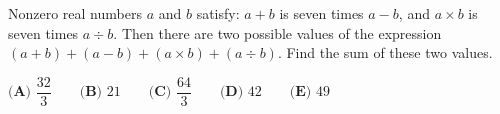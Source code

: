 Nonzero real numbers $a$ and $b$ satisfy: $a+b$ is seven times $a-b$, and $a\times b$ is seven times $a\div b$. Then there are two possible values of the expression $(a+b)+(a-b)+(a\times b)+(a\div b)$. Find the sum of these two values.

$\textbf{(A) }\dfrac{32}{3}\qquad\textbf{(B) }21\qquad\textbf{(C) }\dfrac{64}{3}\qquad\textbf{(D) }42\qquad\textbf{(E) }49$
